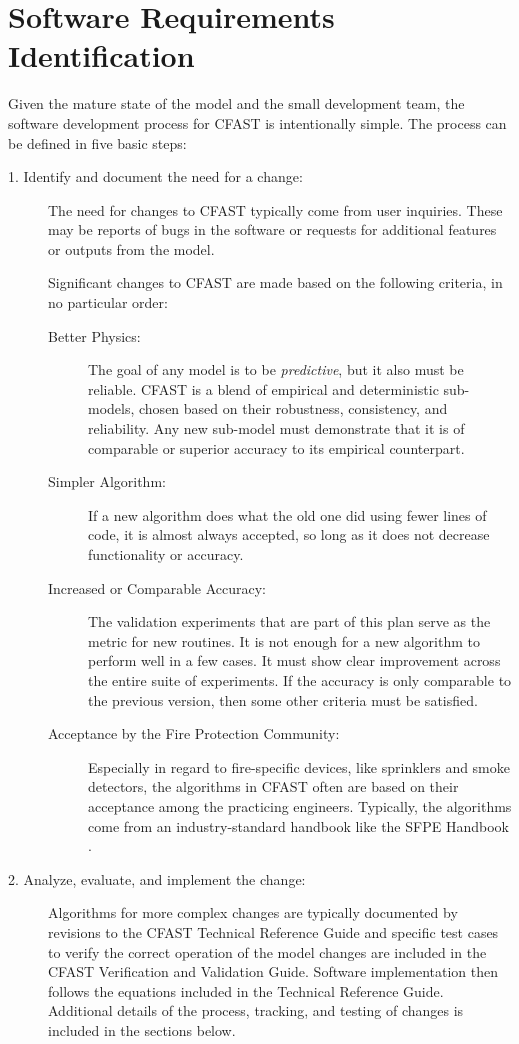 \documentclass[12pt]{book}
\begin{document}
\section{Software Requirements Identification}

Given the mature state of the model and the small development team, the software development process for CFAST is intentionally simple. The process can be defined in five basic steps:

\begin{description}
\item [1. Identify and document the need for a change:] The need for changes to CFAST typically come from user inquiries. These may be reports of bugs in the software or requests for additional features or outputs from the model.

    Significant changes to CFAST are made based on the following criteria, in no particular order:
\begin{description}
\item[Better Physics:] The goal of any model is to be {\em predictive}, but it also must be reliable. CFAST is a blend of empirical and deterministic sub-models, chosen based on their robustness, consistency, and reliability. Any new sub-model must demonstrate that it is of comparable or superior accuracy to its empirical counterpart.
\item[Simpler Algorithm:] If a new algorithm does what the old one did using fewer lines of code, it is almost always accepted, so long as it does not decrease functionality or accuracy.
\item[Increased or Comparable Accuracy:] The validation experiments that are part of this plan serve as the metric for new routines. It is not enough for a new algorithm to perform well in a few cases. It must show clear improvement across the entire suite of experiments. If the accuracy is only comparable to the previous version, then some other criteria must be satisfied.
\item[Acceptance by the Fire Protection Community:] Especially in regard to fire-specific devices, like sprinklers and smoke detectors, the algorithms in CFAST often are based on their acceptance among the practicing engineers. Typically, the algorithms come from an industry-standard handbook like the SFPE Handbook \cite{SFPE:2003}.
\end{description}
\item [2. Analyze, evaluate, and implement the change:] Algorithms for more complex changes are typically documented by revisions to the CFAST Technical Reference Guide and specific test cases to verify the correct operation of the model changes are included in the CFAST Verification and Validation Guide. Software implementation then follows the equations included in the Technical Reference Guide. Additional details of the process, tracking, and testing of changes is included in the sections below.

\end{description}
\end{document}
